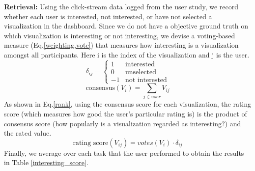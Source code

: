 \par \textbf{Retrieval:} Using the click-stream data logged from the user study, we record whether each user is interested, not interested, or have not selected a visualization in the dashboard. %
Since we do not have a objective ground truth on which visualization is interesting or not interesting, we devise a voting-based measure (Eq.\ref{weighting,vote}) that measures how interesting is a visualization amongst all participants. Here i is the index of the visualization and j is the user.
\begin{equation}\label{weighting}
	\delta_{ij}= \left\{\begin{matrix}
	 1& \textrm{interested}
	\\ 0 & \textrm{unselected}
	\\ -1 & \textrm{not interested}
	\end{matrix}\right.
\end{equation}
\begin{equation}\label{vote}
\textrm{consensus}(V_i) =\sum_{j\in user} V_{ij}
\end{equation}
As shown in Eq.\ref{rank}, using the consensus score for each visualization, the rating score (which measures how good the user's particular rating is) is the product of consensus score (how popularly is a visualization regarded as interesting?) and the rated value.
\begin{equation}\label{rank}
\textrm{rating score}(V_{ij}) =votes(V_i) \cdot \delta_{ij}
\end{equation}
Finally, we average over each task that the user performed to obtain the results in Table \ref{interesting_score}. 

